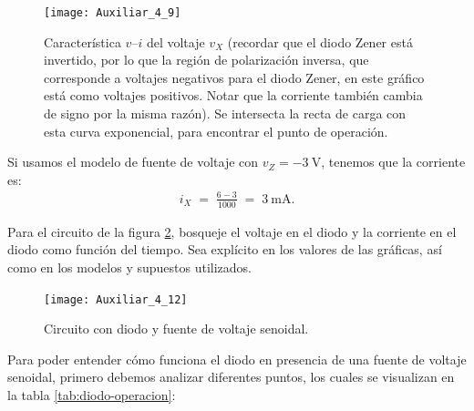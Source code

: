 \documentclass[
  11pt,
  letterpaper,
   addpoints,
  ]{exam}
\begin{document}
\begin{questions}
\begin{solution}
\begin{figure}[H]
  \centering
  \texttt{[image: Auxiliar\_4\_9]}
  \caption{Característica $v$--$i$ del voltaje $v_X$ (recordar que el diodo Zener está invertido, por lo que la región de polarización inversa, que corresponde a voltajes negativos para el diodo Zener, en este gráfico está como voltajes positivos. Notar que la corriente también cambia de signo por la misma razón). Se intersecta la recta de carga con esta curva exponencial, para encontrar el punto de operación.}

  \label{fig:iv-diodo}
\end{figure}
Si usamos el modelo de fuente de voltaje con \(v_Z = -3~\text{V}\), tenemos que la corriente es:
\begin{align}
i_X \;=\; \frac{6 -3 }{1000} \;=\; 3~\text{mA}.
\end{align}
\end{solution}
\newpage
\question Para el circuito de la figura \ref{fig:3}, bosqueje el voltaje en el diodo y la corriente en el diodo como función del tiempo. Sea explícito en los valores de las gráficas, así como en los modelos y supuestos utilizados.
\begin{figure}[H]
  \centering
\texttt{[image: Auxiliar\_4\_12]}
  \caption{Circuito con diodo y fuente de voltaje senoidal.}
  \label{fig:3}
\end{figure}
\begin{solution}
Para poder entender cómo funciona el diodo en presencia de una fuente de voltaje senoidal, primero debemos analizar diferentes puntos, los cuales se visualizan en la tabla \ref{tab:diodo-operacion}:


\end{solution}
\end{questions}
\end{document}

